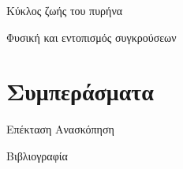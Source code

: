 \documentclass{beamer}
\begin{document}
	\begin{frame}{Κύκλος ζωής του πυρήνα}
		\begin{figure}
			\centering
			\resizebox{5.5cm}{!}{}
		\end{figure}	
	\end{frame}

	\begin{frame}{Φυσική και εντοπισμός συγκρούσεων}
		\begin{figure}
			\centering
			\resizebox{10.5cm}{!}{}
		\end{figure}
	\end{frame}
			
	\section{Συμπεράσματα}
	\begin{frame}{Επέκταση}
		Ανασκόπηση
	\end{frame}
	
		
	\begin{frame}[allowframebreaks]{Βιβλιογραφία}
		
		 
		
		
	\end{frame}
	
\end{document}

